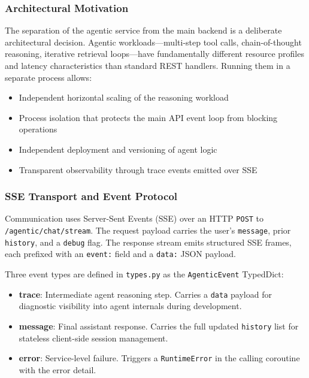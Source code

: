 \documentclass[11pt,twocolumn]{article}
\begin{document}
\subsubsection{Architectural Motivation}

The separation of the agentic service from the main backend is a deliberate architectural decision. Agentic workloads—multi-step tool calls, chain-of-thought reasoning, iterative retrieval loops—have fundamentally different resource profiles and latency characteristics than standard REST handlers. Running them in a separate process allows:

\begin{itemize}
\item Independent horizontal scaling of the reasoning workload
\item Process isolation that protects the main API event loop from blocking operations
\item Independent deployment and versioning of agent logic
\item Transparent observability through trace events emitted over SSE
\end{itemize}

\subsubsection{SSE Transport and Event Protocol}

Communication uses Server-Sent Events (SSE) over an HTTP \texttt{POST} to \texttt{/agentic/chat/stream}. The request payload carries the user's \texttt{message}, prior \texttt{history}, and a \texttt{debug} flag. The response stream emits structured SSE frames, each prefixed with an \texttt{event:} field and a \texttt{data:} JSON payload.

Three event types are defined in \texttt{types.py} as the \texttt{AgenticEvent} TypedDict:

\begin{itemize}
\item \textbf{trace}: Intermediate agent reasoning step. Carries a \texttt{data} payload for diagnostic visibility into agent internals during development.
\item \textbf{message}: Final assistant response. Carries the full updated \texttt{history} list for stateless client-side session management.
\item \textbf{error}: Service-level failure. Triggers a \texttt{RuntimeError} in the calling coroutine with the error detail.
\end{itemize}
\end{document}
